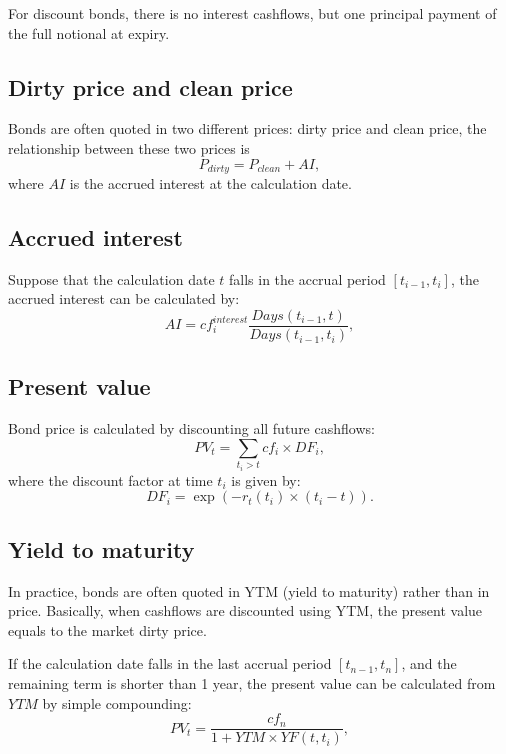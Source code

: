 For discount bonds, there is no interest cashflows, but one principal payment of
the full notional at expiry.

\subsection{Dirty price and clean price}

Bonds are often quoted in two different prices: dirty price and clean price,
the relationship between these two prices is
\begin{equation}
  P_{dirty} = P_{clean} + AI,
\end{equation}
where $AI$ is the accrued interest at the calculation date.

\subsection{Accrued interest}
Suppose that the calculation date $t$ falls in the accrual period
$[t_{i-1},t_{i}]$, the accrued interest can be calculated by:
\begin{equation}
  AI = cf_i^{interest} \frac{ Days(t_{i-1},t) }{Days(t_{i-1},t_{i})}, 
\end{equation}


\subsection{Present value}
Bond price is calculated by discounting all future cashflows:
\begin{equation}
  PV_t = \sum_{t_i>t} cf_i \times DF_i,
\end{equation}
where the discount factor at time $t_i$ is given by:
\[
  DF_i = \exp(-r_t(t_i)\times (t_i-t)).
\]


\subsection{Yield to maturity}

In practice, bonds are often quoted in YTM (yield to maturity) rather than in
price. Basically, when cashflows are discounted using YTM, the present value 
equals to the market dirty price.

If the calculation date falls in the last accrual period $[t_{n-1},t_n]$, and
the remaining term is shorter than 1 year, the present value can be calculated 
from $YTM$ by simple compounding:
\begin{equation}
  PV_t = \frac{cf_n}{ 1+ YTM \times YF(t,t_i) },
\end{equation}

